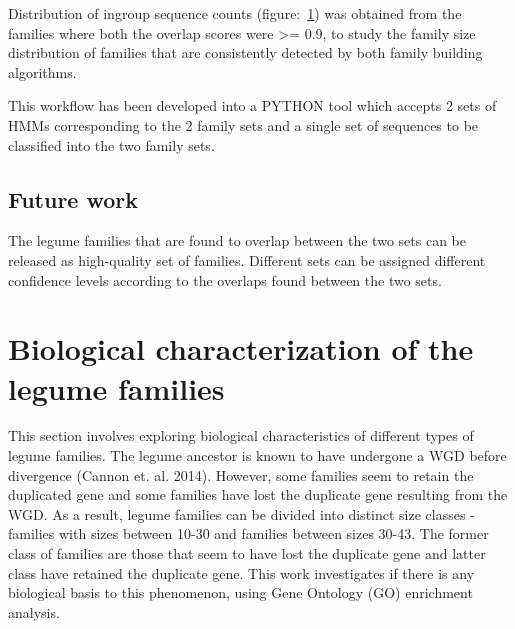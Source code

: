 \documentclass{article}
\begin{document}
		Distribution of ingroup sequence counts (figure:~\ref{fig:hist_seq_ct_lgf5_vs_orthofinder_90percent_overlap}) was obtained from the families where both the overlap scores were >= 0.9, to study the family size distribution of families that are consistently detected by both family building algorithms. 
		\begin{figure}[h!]
			\caption{}
			\label{fig:hist_seq_ct_lgf5_vs_orthofinder_90percent_overlap}
		\end{figure}
		
		This workflow has been developed into a PYTHON tool which accepts 2 sets of HMMs corresponding to the 2 family sets and a single set of sequences to be classified into the two family sets.
		
		\subsection{Future work}
		The legume families that are found to overlap between the two sets can be released as high-quality set of families. Different sets can be assigned different confidence levels according to the overlaps found between the two sets.
	
	
	\section{Biological characterization of the legume families}
	This section involves exploring biological characteristics of different types of legume families. The legume ancestor is known to have undergone a WGD before divergence (Cannon et. al. 2014).  However, some families seem to retain the duplicated gene and some families have lost the duplicate gene resulting from the WGD. As a result, legume families can be divided into distinct size classes - families with sizes between 10-30 and families between sizes 30-43. The former class of families are those that seem to have lost the duplicate gene and latter class have retained the duplicate gene. This work investigates if there is any biological basis to this phenomenon, using Gene Ontology (GO) enrichment analysis. 
	
\end{document}
